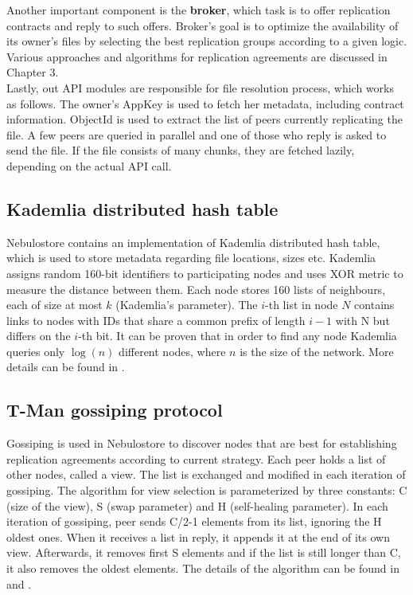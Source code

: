 \documentclass{pracamgren}
\begin{document}
Another important component is the {\bf broker}, which task is to offer replication contracts and reply to such offers. Broker's goal is to optimize the availability of its owner's files by selecting the best replication groups according to a given logic. Various approaches and algorithms for replication agreements are discussed in Chapter 3.\\

Lastly, out API modules are responsible for file resolution process, which works as follows. The owner's AppKey is used to fetch her metadata, including contract information. ObjectId is used to extract the list of peers currently replicating the file. A few peers are queried in parallel and one of those who reply is asked to send the file. If the file consists of many chunks, they are fetched lazily, depending on the actual API call.\\


\subsection{Kademlia distributed hash table}

Nebulostore contains an implementation of Kademlia distributed hash table, which is used to store metadata regarding file locations, sizes etc. Kademlia assigns random 160-bit identifiers to participating nodes and uses XOR metric to measure the distance between them. Each node stores 160 lists of neighbours, each of size at most $k$ (Kademlia's parameter). The $i$-th list in node $N$ contains links to nodes with IDs that share a common prefix of length $i-1$ with N but differs on the $i$-th bit. It can be proven that in order to find any node Kademlia queries only $\log(n)$ different nodes, where $n$ is the size of the network. More details can be found in \cite{kademlia}.\\

\subsection{T-Man gossiping protocol}

Gossiping is used in Nebulostore to discover nodes that are best for establishing replication agreements according to current strategy. Each peer holds a list of other nodes, called a view. The list is exchanged and modified in each iteration of gossiping. The algorithm for view selection is parameterized by three constants: C (size of the view), S (swap parameter) and H (self-healing parameter). In each iteration of gossiping, peer sends C/2-1 elements from its list, ignoring the H oldest ones. When it receives a list in reply, it appends it at the end of its own view. Afterwards, it removes first S elements and if the list is still longer than C, it also removes the oldest elements. The details of the algorithm can be found in \cite{gossiping} and \cite{tman}.\\
\end{document}

